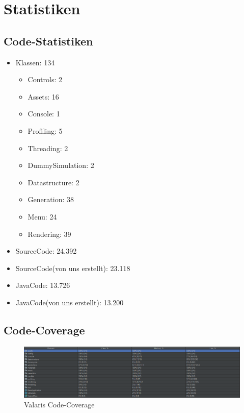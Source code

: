 \documentclass[parskip=full]{scrartcl}
\begin{document}
	\section{Statistiken}

		\subsection{Code-Statistiken}

			\begin{itemize}
				\item Klassen: 134
				\begin{itemize}
					\item Controls: 2
					\item Assets: 16
					\item Console: 1
					\item Profiling: 5
					\item Threading: 2
					\item DummySimulation: 2
					\item Datastructure: 2
					\item Generation: 38
					\item Menu: 24
					\item Rendering: 39
				\end{itemize}
				\item SourceCode: 24.392
				\item SourceCode(von uns erstellt): 23.118
				\item JavaCode: 13.726
				\item JavaCode(von uns erstellt): 13.200
				
			\end{itemize}



		\subsection{Code-Coverage}

		\begin{figure}[htbp]
			\centering
			\includegraphics[width=\linewidth]{./Bilder/coveradeValaris.png}
			\caption{Valaris Code-Coverage}
		\end{figure}
\end{document}
